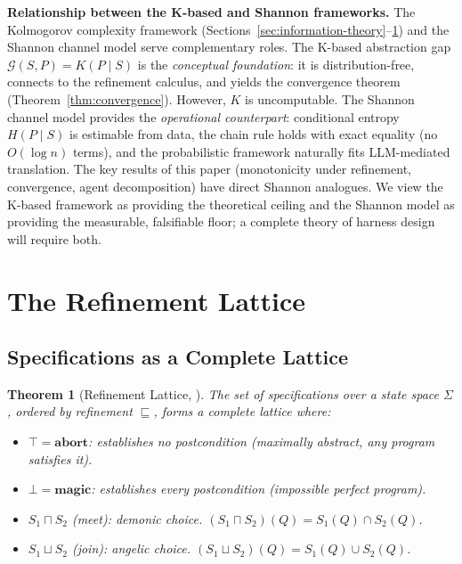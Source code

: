 \documentclass[11pt, a4paper, logo, copyright]{googledeepmind}
\newtheorem{theorem}{Theorem}[section]
\begin{document}
\textbf{Relationship between the K-based and Shannon frameworks.} The Kolmogorov complexity framework (Sections~\ref{sec:information-theory}--\ref{sec:refinement-lattice}) and the Shannon channel model serve complementary roles. The K-based abstraction gap $\mathcal{G}(S, P) = K(P \mid S)$ is the \emph{conceptual foundation}: it is distribution-free, connects to the refinement calculus, and yields the convergence theorem (Theorem~\ref{thm:convergence}). However, $K$ is uncomputable. The Shannon channel model provides the \emph{operational counterpart}: conditional entropy $H(P \mid S)$ is estimable from data, the chain rule holds with exact equality (no $O(\log n)$ terms), and the probabilistic framework naturally fits LLM-mediated translation. The key results of this paper (monotonicity under refinement, convergence, agent decomposition) have direct Shannon analogues. We view the K-based framework as providing the theoretical ceiling and the Shannon model as providing the measurable, falsifiable floor; a complete theory of harness design will require both.


\section{The Refinement Lattice}
\label{sec:refinement-lattice}

\subsection{Specifications as a Complete Lattice}

\begin{theorem}[Refinement Lattice, \citealp{back1980correctness, morgan1994programming}]
\label{thm:lattice}
The set of specifications over a state space $\Sigma$, ordered by refinement $\sqsubseteq$, forms a \emph{complete lattice} where:
\begin{itemize}
    \item $\top = \textbf{abort}$: establishes no postcondition (maximally abstract, any program satisfies it).
    \item $\bot = \textbf{magic}$: establishes every postcondition (impossible perfect program).
    \item $S_1 \sqcap S_2$ (meet): demonic choice. $(S_1 \sqcap S_2)(Q) = S_1(Q) \cap S_2(Q)$.
    \item $S_1 \sqcup S_2$ (join): angelic choice. $(S_1 \sqcup S_2)(Q) = S_1(Q) \cup S_2(Q)$.
\end{itemize}
\end{theorem}
\end{document}
